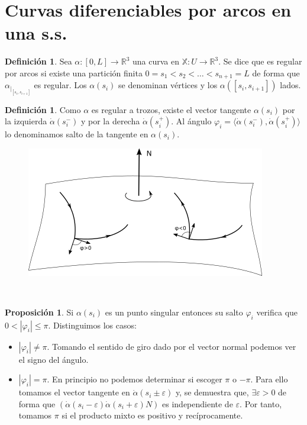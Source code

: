 \documentclass[twoside]{report}
\theoremstyle{definition}
\newtheorem{defi}[theorem]{Definición}
\newtheorem{prop}[theorem]{Proposición}
\numberwithin{equation}{section}
\newcommand{\R}{\mathbb{R}}
\newcommand{\X}{\mathbb{X}}
\begin{document}
\section{Curvas diferenciables por arcos en una s.s.}
\begin{defi} 
Sea $\alpha:[0,L] \rightarrow \R^3$ una curva en $\X:U\rightarrow \R^3$. Se dice que es regular por arcos si existe una partición finita $0=s_1 < s_2 < \dotsc < s_{n+1} = L$ de forma que $\alpha_{|_{[s_i,s_{i+1}]}}$ es regular. Los $\alpha(s_i)$ se denominan vértices y los $\alpha([s_i,s_{i+1}])$ lados.
\end{defi}
\begin{defi}
Como $\alpha$ es regular a trozos, existe el vector tangente $\alpha(s_i)$ por la izquierda $\dot{\alpha}(s_i^-)$ y por la derecha $\dot{\alpha}(s_i^+)$. Al ángulo $\varphi_i = \langle \dot{\alpha}(s_i^-),\dot{\alpha}(s_i^+)\rangle$ lo denominamos salto de la tangente en $\alpha(s_i)$.

\begin{figure}[h!]
	\centering
	\includegraphics[scale=0.4]{normal}
\end{figure}\

\end{defi}
\begin{prop}
Si $\alpha(s_i)$ es un punto singular entonces su salto $\varphi_i$ verifica que $0<|\varphi_i|\leq \pi$. Distinguimos los casos:
\begin{itemize}
\item $|\varphi_i|\neq \pi$. Tomando el sentido de giro dado por el vector normal podemos ver el signo del ángulo.
\item $|\varphi_i| = \pi$. En principio no podemos determinar si escoger $\pi$ o $-\pi$. Para ello tomamos el vector tangente en $\dot{\alpha}(s_i\pm\varepsilon)$ y, se demuestra que, $\exists \varepsilon >0$ de forma que $(\dot{\alpha}(s_i -\varepsilon) \dot{\alpha}(s_i+\varepsilon) N)$ es independiente de $\varepsilon$. Por tanto, tomamos $\pi$ si el producto mixto es positivo y recíprocamente.
\end{itemize}
\end{prop}
\end{document}
